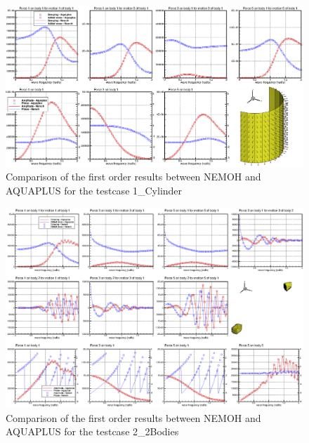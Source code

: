 \documentclass[12pt,a4paper,titlepage]{article}
\begin{document}
\begin{figure}[ht]
\centering
\includegraphics[scale=0.8,trim = 0mm 0mm 0mm 0mm, clip]{figures/Ver_Cylinder.eps}
\caption{Comparison of the first order results between NEMOH and AQUAPLUS for the testcase 1\_Cylinder}\label{fig:Cylinder}
\end{figure}

\begin{figure}[ht!]
\centering
\includegraphics[scale=0.8,trim = 0mm 0mm 0mm 0mm, clip]{figures/Ver_2Bodies.eps}
\caption{Comparison of the first order results between NEMOH and AQUAPLUS for the testcase 2\_2Bodies}\label{fig:2Bodies}
\end{figure}
\end{document}
